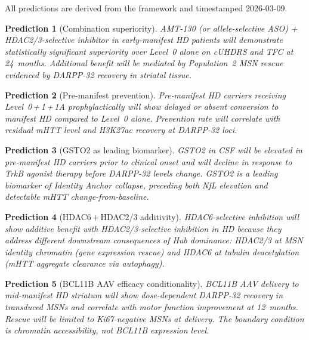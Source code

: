 \documentclass[12pt,a4paper]{article}
\newtheorem{prediction}{Prediction}
\begin{document}
All predictions are derived from the framework and
timestamped 2026-03-09.

\begin{prediction}[Combination superiority]
\label{pred:combo}
AMT-130 (or allele-selective ASO) + HDAC2/3-selective
inhibitor in early-manifest HD patients will demonstrate
statistically significant superiority over Level~0 alone
on cUHDRS and TFC at 24~months. Additional benefit will be
mediated by Population~2 MSN rescue evidenced by DARPP-32
recovery in striatal tissue.
\end{prediction}

\begin{prediction}[Pre-manifest prevention]
\label{pred:premanifest}
Pre-manifest HD carriers receiving Level~0\,+\,1\,+\,1A
prophylactically will show delayed or absent conversion to
manifest HD compared to Level~0 alone. Prevention rate
will correlate with residual mHTT level and H3K27ac
recovery at DARPP-32 loci.
\end{prediction}

\begin{prediction}[GSTO2 as leading biomarker]
\label{pred:gsto2}
GSTO2 in CSF will be elevated in pre-manifest HD carriers
prior to clinical onset and will decline in response to
TrkB agonist therapy before DARPP-32 levels change. GSTO2
is a leading biomarker of Identity Anchor collapse,
preceding both NfL elevation and detectable mHTT
change-from-baseline.
\end{prediction}

\begin{prediction}[HDAC6\,+\,HDAC2/3 additivity]
\label{pred:hdac_add}
HDAC6-selective inhibition will show additive benefit with
HDAC2/3-selective inhibition in HD because they address
different downstream consequences of Hub dominance:
HDAC2/3 at MSN identity chromatin (gene expression rescue)
and HDAC6 at tubulin deacetylation (mHTT aggregate
clearance via autophagy).
\end{prediction}

\begin{prediction}[BCL11B AAV efficacy conditionality]
\label{pred:bcl11b}
BCL11B AAV delivery to mid-manifest HD striatum will show
dose-dependent DARPP-32 recovery in transduced MSNs and
correlate with motor function improvement at 12~months.
Rescue will be limited to Ki67-negative MSNs at delivery.
The boundary condition is chromatin accessibility, not
BCL11B expression level.
\end{prediction}
\end{document}

